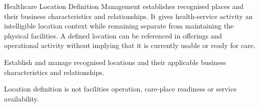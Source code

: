Healthcare Location Definition Management establishes recognised places and their business characteristics and relationships. It gives health-service activity an intelligible location context while remaining separate from maintaining the physical facilities. A defined location can be referenced in offerings and operational activity without implying that it is currently usable or ready for care.



Establish and manage recognised locations and their applicable business characteristics and relationships.



Location definition is not facilities operation, care-place readiness or service availability.


